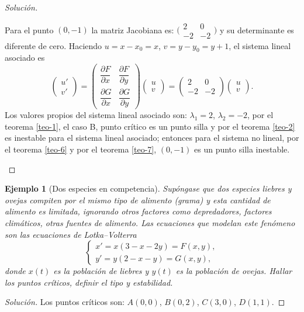 \documentclass[a5paper,doc,10pt,noapacite]{apa6}
\newtheorem{ejem}{Ejemplo}
\begin{document}
{{\begin{proof}[Solución]
\begin{APAitemize}
		
	\item Para el punto \((0,-1)\) la matriz Jacobiana es: \(\Big(\begin{smallmatrix} 2 & 0 \\ -2 & -2\end{smallmatrix}\Big)\) y su determinante es diferente de cero. Haciendo \(u=x-x_0=x\),  \(v=y-y_0=y+1\), el sistema lineal asociado es
		\[
		\begin{pmatrix}u'\\v'\end{pmatrix}=\begin{pmatrix} \dfrac{\partial F}{\partial x} & \dfrac{\partial F}{\partial y} \\ \dfrac{\partial G}{\partial x} & \dfrac{\partial G}{\partial y}\end{pmatrix}\begin{pmatrix} u \\ v\end{pmatrix}=\begin{pmatrix} 2 & 0 \\ -2 & -2\end{pmatrix}\begin{pmatrix} u \\ v\end{pmatrix}.
		\]
		Los valores propios  del sistema lineal asociado son: \(\lambda_1=2\), \(\lambda_2=-2\), por el teorema \eqref{teo-1}, el caso B, punto crítico es un punto silla y por el teorema \eqref{teo-2} es inestable para el sistema lineal asociado; entonces para el sistema no lineal, por el teorema \eqref{teo-6} y por el teorema \eqref{teo-7},	\((0,-1)\) es un punto silla inestable.	\qedhere
	\end{APAitemize}
\end{proof}


\begin{ejem}[Dos especies en competencia]
	Supóngase que dos especies liebres y ovejas compiten por el mismo tipo de alimento (grama) y esta cantidad de alimento es limitada, ignorando otros factores como depredadores, factores climáticos, otras fuentes de alimento. Las ecuaciones que modelan este fenómeno son las ecuaciones de Lotka--Volterra
	\[
	\begin{cases}
		x'=x(3-x-2y)=F(x,y),
		\\
		y'=y(2-x-y)=G(x,y),
	\end{cases}
	\]
	donde \(x(t)\) es la población de liebres y \(y(t)\) es la población de ovejas. Hallar los puntos críticos, definir el tipo y estabilidad.
\end{ejem}
\begin{proof}[Solución]
		Los puntos críticos son: \(A(0,0)\), \(B(0,2)\), \(C(3,0)\), \(D(1,1)\).
		

\end{proof}}}
\end{document}
